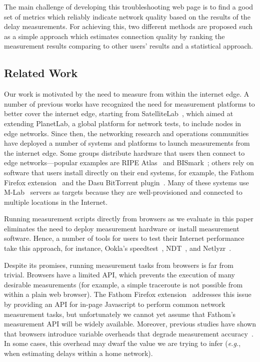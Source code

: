 \documentclass{sig-alternate-10pt}
\begin{document}
The main challenge of developing this troubleshooting web page is to find a good set of metrics which reliably indicate network quality based on the results of the delay measurements. For achieving this, two different methods are proposed such as a simple approach which estimates connection quality by ranking the measurement results comparing to other users' results and a statistical approach.

\subsection{Related Work}

Our work is motivated by the need to measure from within the internet edge. A number of previous works have recognized the need for measurement platforms to better cover the internet edge, starting from SatelliteLab~\cite{dischinger_satellitelab:_2008}, which aimed at extending PlanetLab, a global platform for network tests, to include nodes in edge networks. Since then, the networking research and operations communities have deployed a number of systems and platforms to launch measurements from the internet edge. Some groups distribute hardware that users then connect to edge networks---popular examples are RIPE Atlas~\cite{ripe_ncc_ripe_????} and BISmark~\cite{sundaresan_bismark:_2014}; others rely on software that users install directly on their end systems, for example, the Fathom Firefox extension~\cite{dhawan_fathom:_2012} and the Dasu BitTorrent plugin~\cite{sanchez_dasu:_2013}. Many of these systems use M-Lab~\cite{_measurement_????} servers as targets because they are well-provisioned and connected to multiple locations in the Internet. 

Running measurement scripts directly from browsers as we evaluate in this paper eliminates the need to deploy measurement hardware or install measurement software. Hence, a number of tools for users to test their Internet performance take this approach, for instance, Ookla's speedtest~\cite{ookla_speedtest_????}, NDT~\cite{carlson_network_????}, and Netlyzr~\cite{kreibich_netalyzr:_2010-1}.

Despite its promises, running measurement tasks from browsers is far from trivial. Browsers have a limited API, which prevents the execution of many desirable measurements (for example, a simple traceroute is not possible from within a plain web browser). The Fathom Firefox extension~\cite{dhawan_fathom:_2012} addresses this issue by providing an API for in-page Javascript to perform common network measurement tasks, but unfortunately we cannot yet assume that Fathom's measurement API will be widely available. Moreover, previous studies have shown that browsers introduce variable overheads that degrade measurement accuracy~\cite{li_appraising_2013}. In some cases, this overhead may dwarf the value we are trying to infer (\textit{e.g.}, when estimating delays within a home network).
\end{document}
